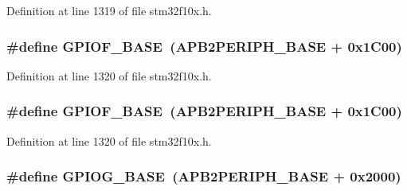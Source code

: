 Definition at line 1319 of file stm32f10x.\+h.

\subsubsection[{\texorpdfstring{G\+P\+I\+O\+F\+\_\+\+B\+A\+SE}{GPIOF_BASE}}]{\setlength{\rightskip}{0pt plus 5cm}\#define G\+P\+I\+O\+F\+\_\+\+B\+A\+SE~({\bf A\+P\+B2\+P\+E\+R\+I\+P\+H\+\_\+\+B\+A\+SE} + 0x1\+C00)}\hypertarget{group___peripheral__memory__map_ga7f9a3f4223a1a784af464a114978d26e}{}\label{group___peripheral__memory__map_ga7f9a3f4223a1a784af464a114978d26e}


Definition at line 1320 of file stm32f10x.\+h.

\subsubsection[{\texorpdfstring{G\+P\+I\+O\+F\+\_\+\+B\+A\+SE}{GPIOF_BASE}}]{\setlength{\rightskip}{0pt plus 5cm}\#define G\+P\+I\+O\+F\+\_\+\+B\+A\+SE~({\bf A\+P\+B2\+P\+E\+R\+I\+P\+H\+\_\+\+B\+A\+SE} + 0x1\+C00)}\hypertarget{group___peripheral__memory__map_ga7f9a3f4223a1a784af464a114978d26e}{}\label{group___peripheral__memory__map_ga7f9a3f4223a1a784af464a114978d26e}


Definition at line 1320 of file stm32f10x.\+h.

\subsubsection[{\texorpdfstring{G\+P\+I\+O\+G\+\_\+\+B\+A\+SE}{GPIOG_BASE}}]{\setlength{\rightskip}{0pt plus 5cm}\#define G\+P\+I\+O\+G\+\_\+\+B\+A\+SE~({\bf A\+P\+B2\+P\+E\+R\+I\+P\+H\+\_\+\+B\+A\+SE} + 0x2000)}\hypertarget{group___peripheral__memory__map_ga5d8ca4020f2e8c00bde974e8e7c13cfe}{}\label{group___peripheral__memory__map_ga5d8ca4020f2e8c00bde974e8e7c13cfe}


